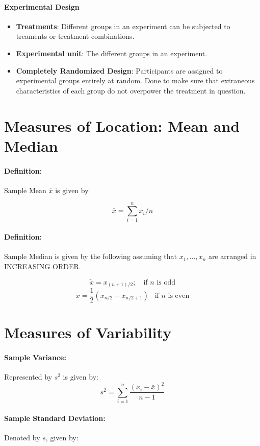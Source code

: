 \documentclass[a4paper,12pt]{report}
\begin{document}
\paragraph{Experimental Design} 

\begin{itemize}
\item \textbf{Treatments}: Different groups in an experiment can be subjected to treaments or treatment combinations.
\item \textbf{Experimental unit}: The different groups in an experiment.
\item \textbf{Completely Randomized Design}: Participants are assigned to experimental groups entirely at random. Done to make sure that extraneous characteristics of each group do not overpower the treatment in question.
\end{itemize}

\section{Measures of Location: Mean and Median}
\paragraph{Definition: } Sample Mean $\bar{x}$ is given by 

$$\bar{x} = \sum_{i=1}^n x_i/n$$

\paragraph{Definition: } Sample Median is given by the following assuming that $x_1, ..., x_n$ are arranged in INCREASING ORDER.

$$\tilde{x} = x_{(n+1)/2};\,\,\,\,\,\,\text{if $n$ is odd}$$
$$\tilde{x} = \frac{1}{2} (x_{n/2} + x_{n/2+1})\,\,\,\,\,\text{if $n$ is even}$$

\section{Measures of Variability}

\paragraph{Sample Variance: } Represented by $s^2$ is given by:
$$s^2 = \sum_{i = 1}^n \frac{(x_i - \bar{x})^2}{n-1}$$

\paragraph{Sample Standard Deviation: } Denoted by $s$, given by: 
\end{document}
